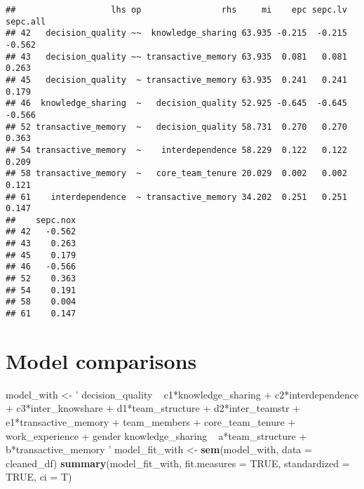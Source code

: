 \documentclass[]{article}
\newenvironment{Shaded}{\begin{snugshade}}{\end{snugshade}}
\newcommand{\DataTypeTok}[1]{\textcolor[rgb]{0.13,0.29,0.53}{#1}}
\newcommand{\KeywordTok}[1]{\textcolor[rgb]{0.13,0.29,0.53}{\textbf{#1}}}
\newcommand{\NormalTok}[1]{#1}
\newcommand{\OtherTok}[1]{\textcolor[rgb]{0.56,0.35,0.01}{#1}}
\newcommand{\StringTok}[1]{\textcolor[rgb]{0.31,0.60,0.02}{#1}}
\begin{document}
\begin{verbatim}
##                   lhs op                rhs     mi    epc sepc.lv sepc.all
## 42   decision_quality ~~  knowledge_sharing 63.935 -0.215  -0.215   -0.562
## 43   decision_quality ~~ transactive_memory 63.935  0.081   0.081    0.263
## 45   decision_quality  ~ transactive_memory 63.935  0.241   0.241    0.179
## 46  knowledge_sharing  ~   decision_quality 52.925 -0.645  -0.645   -0.566
## 52 transactive_memory  ~   decision_quality 58.731  0.270   0.270    0.363
## 54 transactive_memory  ~    interdependence 58.229  0.122   0.122    0.209
## 58 transactive_memory  ~   core_team_tenure 20.029  0.002   0.002    0.121
## 61    interdependence  ~ transactive_memory 34.202  0.251   0.251    0.147
##    sepc.nox
## 42   -0.562
## 43    0.263
## 45    0.179
## 46   -0.566
## 52    0.363
## 54    0.191
## 58    0.004
## 61    0.147
\end{verbatim}

\hypertarget{model-comparisons}{%
\section{Model comparisons}\label{model-comparisons}}

\begin{Shaded}
\begin{Highlighting}[]
\NormalTok{model_with <-}\StringTok{ '}
\StringTok{decision_quality ~ c1*knowledge_sharing + c2*interdependence + c3*inter_knowshare + d1*team_structure + d2*inter_teamstr + e1*transactive_memory + team_members + core_team_tenure + work_experience + gender}
\StringTok{knowledge_sharing ~ a*team_structure + b*transactive_memory}
\StringTok{'}
\NormalTok{model_fit_with <-}\StringTok{ }\KeywordTok{sem}\NormalTok{(model_with, }\DataTypeTok{data =}\NormalTok{ cleaned_df)}
\KeywordTok{summary}\NormalTok{(model_fit_with, }\DataTypeTok{fit.measures =} \OtherTok{TRUE}\NormalTok{, }\DataTypeTok{standardized =} \OtherTok{TRUE}\NormalTok{, }\DataTypeTok{ci =}\NormalTok{ T)}
\end{Highlighting}
\end{Shaded}
\end{document}
